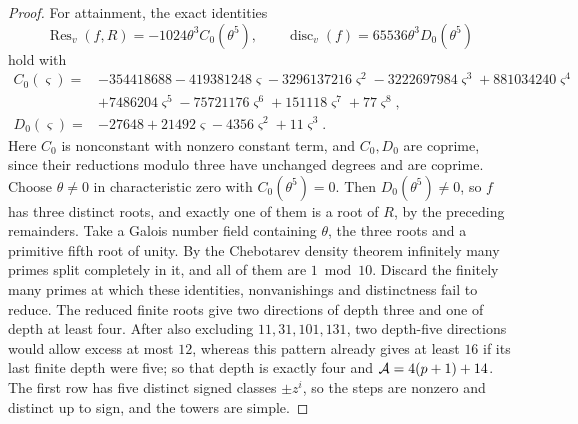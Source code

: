 \begin{proof}
For attainment, the exact identities
\[
 \operatorname{Res}_v(f,R)=-1024\theta^3C_0(\theta^5),\qquad
 \operatorname{disc}_v(f)=65536\theta^3D_0(\theta^5)
\]
hold with
\[
\begin{split}
 C_0(\varsigma)={}&-354418688-419381248\varsigma-3296137216\varsigma^2
 -3222697984\varsigma^3+881034240\varsigma^4\\
 &+7486204\varsigma^5-75721176\varsigma^6+151118\varsigma^7+77\varsigma^8,\\
 D_0(\varsigma)={}&-27648+21492\varsigma-4356\varsigma^2+11\varsigma^3 .
\end{split}
\]
Here $C_0$ is nonconstant with nonzero constant term, and $C_0,D_0$ are
coprime, since their reductions modulo three have unchanged degrees and are
coprime. Choose $\theta\ne0$ in characteristic zero with $C_0(\theta^5)=0$.
Then $D_0(\theta^5)\ne0$, so $f$ has three distinct roots, and exactly one
of them is a root of $R$, by the preceding remainders. Take a Galois number field containing
$\theta$, the three roots and a primitive fifth root of unity. By the
Chebotarev density theorem infinitely many primes split completely in it,
and all of them are $1\bmod10$. Discard the finitely many primes at which
these identities, nonvanishings and distinctness fail to reduce. The
reduced finite roots give two directions of depth three and one of depth
at least four. After also excluding $11,31,101,131$, two depth-five
directions would allow excess at most $12$, whereas this pattern already
gives at least $16$ if its last finite depth were five; so that depth is
exactly four and $\mathcal{A}=4(p+1)+14$. The first row has five distinct signed
classes $\pm z^i$, so the steps are nonzero and distinct up to sign, and
the towers are simple.
\end{proof}


